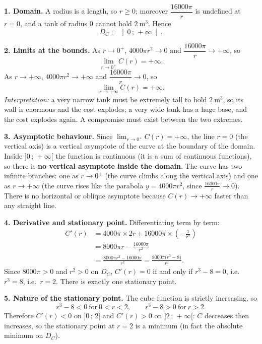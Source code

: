\documentclass[11pt]{article}
\newcommand{\cle}[1]{{\popxbold\color{popdark}#1}}
\begin{document}
\begin{corrige}

\textbf{1. Domain.} A radius is a length, so $r \geq 0$; moreover $\dfrac{16000\pi}{r}$ is undefined at $r = 0$, and a tank of radius $0$ cannot hold $2\ \mathrm{m^3}$. Hence
\[
D_C = \left]0\,;\,+\infty\right[.
\]

\textbf{2. Limits at the bounds.} As $r \to 0^{+}$, $4000\pi r^{2} \to 0$ and $\dfrac{16000\pi}{r} \to +\infty$, so
\[
\lim_{r \to 0^{+}} C(r) = +\infty.
\]
As $r \to +\infty$, $4000\pi r^{2} \to +\infty$ and $\dfrac{16000\pi}{r} \to 0$, so
\[
\lim_{r \to +\infty} C(r) = +\infty.
\]
\emph{Interpretation:} a very narrow tank must be extremely tall to hold $2\ \mathrm{m^3}$, so its wall is enormous and the cost explodes; a very wide tank has a huge base, and the cost explodes again. A compromise must exist between the two extremes.

\textbf{3. Asymptotic behaviour.} Since $\displaystyle\lim_{r \to 0^{+}} C(r) = +\infty$, the line $r = 0$ (the vertical axis) is a \cle{vertical asymptote} of the curve at the boundary of the domain. Inside $]0\,;\,+\infty[$ the function is continuous (it is a sum of continuous functions), so there is \textbf{no vertical asymptote inside the domain}. The curve has two \cle{infinite branches}: one as $r \to 0^{+}$ (the curve climbs along the vertical axis) and one as $r \to +\infty$ (the curve rises like the parabola $y = 4000\pi r^{2}$, since $\frac{16000\pi}{r} \to 0$). There is no horizontal or oblique asymptote because $C(r) \to +\infty$ faster than any straight line.

\textbf{4. Derivative and stationary point.} Differentiating term by term:
\begin{align*}
C'(r) &= 4000\pi \times 2r + 16000\pi \times \left(-\frac{1}{r^{2}}\right) \\
&= 8000\pi r - \frac{16000\pi}{r^{2}} \\
&= \frac{8000\pi r^{3} - 16000\pi}{r^{2}} = \frac{8000\pi\bigl(r^{3} - 8\bigr)}{r^{2}}.
\end{align*}
Since $8000\pi > 0$ and $r^{2} > 0$ on $D_C$, $C'(r) = 0$ if and only if $r^{3} - 8 = 0$, i.e.\ $r^{3} = 8$, i.e.\ $\boxed{r = 2}$. There is exactly one stationary point.

\textbf{5. Nature of the stationary point.} The cube function is strictly increasing, so
\[
r^{3} - 8 < 0 \ \text{for}\ 0 < r < 2, \qquad r^{3} - 8 > 0 \ \text{for}\ r > 2.
\]
Therefore $C'(r) < 0$ on $]0\,;\,2[$ and $C'(r) > 0$ on $]2\,;\,+\infty[$: $C$ decreases then increases, so the stationary point at $r = 2$ is a \cle{minimum} (in fact the absolute minimum on $D_C$).


\end{corrige}
\end{document}
